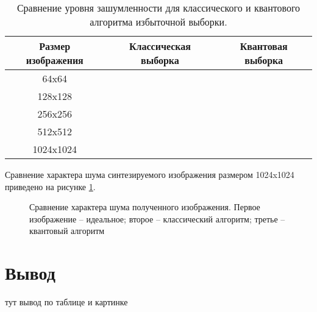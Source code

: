 \begin{table}[h!]
	\label{tab:noise}
	\caption{Сравнение уровня зашумленности для классического и квантового алгоритма избыточной выборки.}
	\begin{center}
		\begin{tabular}{|c c c|} 
			\hline
			Размер изображения & Классическая выборка & Квантовая выборка \\  
			\hline
			64x64 &  &   \\
			\hline
			128x128 &  &  \\
			\hline
			256x256 &  &   \\
			\hline
			512x512 &  & \\
			\hline
			1024x1024 &   & \\
			\hline
		\end{tabular}
	\end{center}
\end{table}

Сравнение характера шума синтезируемого изображения размером 1024x1024 приведено на рисунке \ref{img:noise}.

\begin{figure}[h!]
	\begin{center}
	\end{center}
	\captionsetup{justification=centering}
	\caption{Сравнение характера шума полученного изображения. Первое изображение -- идеальное; второе -- классический алгоритм; третье -- квантовый алгоритм}
	\label{img:noise}
\end{figure}


\section*{Вывод}

тут вывод по таблице и картинке